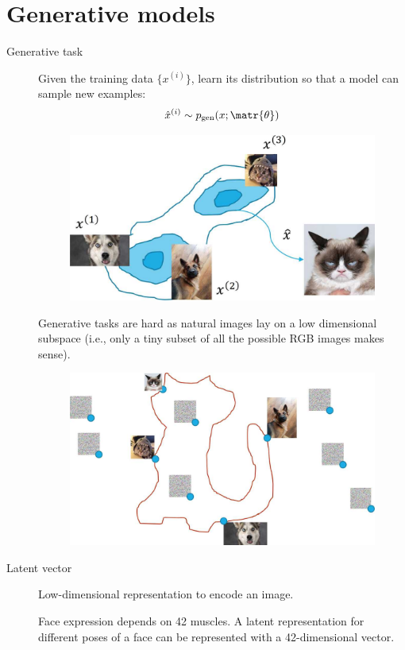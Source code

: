 \chapter{Generative models}


\begin{description}
    \item[Generative task] 
        Given the training data $\{ x^{(i)} \}$, learn its distribution so that a model can sample new examples:
        \[ \hat{x}^{(i)} \sim p_\text{gen}(x; \matr{\theta}) \]

        \begin{figure}[H]
            \centering
            \includegraphics[width=0.4\linewidth]{./img/generative_task.jpg}
        \end{figure}

        \begin{remark}
            Generative tasks are hard as natural images lay on a low dimensional subspace (i.e., only a tiny subset of all the possible RGB images makes sense).

            \begin{figure}[H]
                \centering
                \includegraphics[width=0.6\linewidth]{./img/image_manifold.jpg}
            \end{figure}
        \end{remark}

    \item[Latent vector] 
        Low-dimensional representation to encode an image.

        \begin{example}
            Face expression depends on 42 muscles. A latent representation for different poses of a face can be represented with a 42-dimensional vector.
        \end{example}


\end{description}

